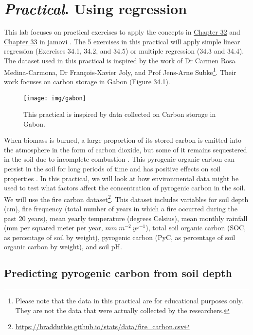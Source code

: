 \documentclass[
]{scrbook}
\begin{document}
\hypertarget{Chapter_34}{%
\chapter{\texorpdfstring{\emph{Practical}. Using regression}{Practical. Using regression}}\label{Chapter_34}}

This lab focuses on practical exercises to apply the concepts in \protect\hyperlink{Chapter_32}{Chapter 32} and \protect\hyperlink{Chapter_33}{Chapter 33} in jamovi \citep{Jamovi2022}.
The 5 exercises in this practical will apply simple linear regression (Exercises 34.1, 34.2, and 34.5) or multiple regression (34.3 and 34.4).
The dataset used in this practical is inspired by the work of Dr Carmen Rosa Medina-Carmona, Dr François-Xavier Joly, and Prof Jens-Arne Subke\footnote{Please note that the data in this practical are for educational purposes only. They are not the data that were actually collected by the researchers.}.
Their work focuses on carbon storage in Gabon (Figure 34.1).

\begin{figure}
\texttt{[image: img/gabon]} \caption{This practical is inspired by data collected on Carbon storage in Gabon.}\label{fig:unnamed-chunk-175}
\end{figure}

When biomass is burned, a large proportion of its stored carbon is emitted into the atmosphere in the form of carbon dioxide, but some of it remains sequestered in the soil due to incomplete combustion \citep{Santin2016}.
This pyrogenic organic carbon can persist in the soil for long periods of time and has positive effects on soil properties \citep{Reisser2016}.
In this practical, we will look at how environmental data might be used to test what factors affect the concentration of pyrogenic carbon in the soil.
We will use the fire carbon dataset\footnote{\url{https://bradduthie.github.io/stats/data/fire_carbon.csv}}.
This dataset includes variables for soil depth (cm), fire frequency (total number of years in which a fire occurred during the past 20 years), mean yearly temperature (degrees Celsius), mean monthly rainfall (mm per squared meter per year, \(mm\:m^{-2}\:yr^{-1}\)), total soil organic carbon (SOC, as percentage of soil by weight), pyrogenic carbon (PyC, as percentage of soil organic carbon by weight), and soil pH.

\hypertarget{predicting-pyrogenic-carbon-from-soil-depth}{%
\section{Predicting pyrogenic carbon from soil depth}\label{predicting-pyrogenic-carbon-from-soil-depth}}
\end{document}
